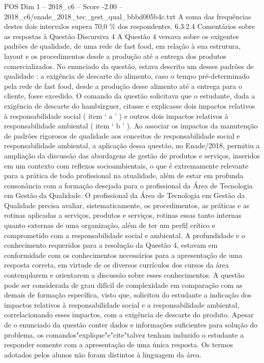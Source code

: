 \begin{textsample}{POS Dim 1 – 2018\_c6 – Score -2.00 – 2018\_c6/enade\_2018\_tec\_gest\_qual\_bbbd005b4c.txt}
A soma das frequências destes dois intervalos supera 70,0 \% dos respondentes. 6.3.2.4 Comentários sobre as respostas à Questão Discursiva 4 A Questão 4 versava sobre os exigentes padrões de qualidade, de uma rede de fast food, em relação à sua estrutura, layout e os procedimentos desde a produção até a entrega dos produtos comercializados.
No enunciado da questão, estava descrito um desses padrões de qualidade : a exigência de descarte do alimento, caso o tempo pré-determinado pela rede de fast food, desde a produção desse alimento até a entrega para o cliente, fosse excedido.
O comando da questão solicitava que o estudante, dada a exigência de descarte do hambúrguer, citasse e explicasse dois impactos relativos à responsabilidade social ( item ‘ a ’ ) e outros dois impactos relativos à responsabilidade ambiental ( item ‘ b ’ ).
Ao associar os impactos da manutenção de padrões rigorosos de qualidade aos conceitos de responsabilidade social e responsabilidade ambiental, a aplicação dessa questão, no Enade/2018, permitiu a ampliação da discussão das abordagens de gestão de produtos e serviços, inseridos em um contexto com reflexos socioambientais, o que é extremamente relevante para a prática de todo profissional na atualidade, além de estar em profunda consonância com a formação desejada para o profissional da Área de Tecnologia em Gestão da Qualidade.
O profissional da Área de Tecnologia em Gestão da Qualidade precisa avaliar, sistematicamente, os procedimentos, as práticas e as rotinas aplicadas a serviços, produtos e serviços, rotinas essas tanto internas quanto externas de uma organização, além de ter um perfil crítico e comprometido com a responsabilidade social e ambiental.
A profundidade e o conhecimento requeridos para a resolução da Questão 4, estavam em conformidade com os conhecimentos necessários para a apresentação de uma resposta correta, em virtude de os diversos currículos dos cursos da área contemplarem e orientarem a discussão sobre esses conhecimentos.
A questão pode ser considerada de grau difícil de complexidade em comparação com as demais de formação específica, visto que, solicitou do estudante a indicação dos impactos relativos à responsabilidade social e a responsabilidade ambiental, correlacionando esses impactos, com a exigência de descarte do produto.
Apesar de o enunciado da questão conter dados e informações suficientes para solução do problema, os comandos"explique"e"cite"talvez tenham induzido o estudante a responder somente com a apresentação de uma única resposta.
Os termos adotados pelos alunos não foram distintos à linguagem da área.

\end{textsample}
